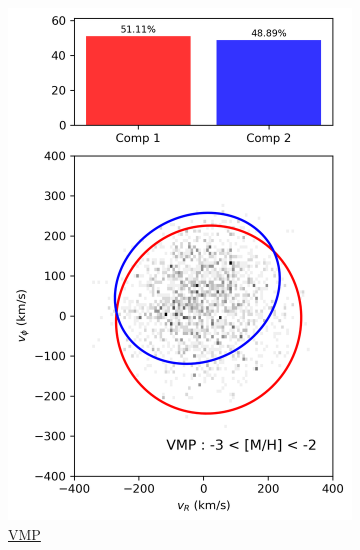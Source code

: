 \documentclass[a4paper,10pt]{article}
\begin{document}
\begin{multicols}{2}
\begin{figure}[H]
  \centering
  \begin{subfigure}[t]{0.24\linewidth}
    \includegraphics[width=\linewidth]{../figures/gmm_VMP.png}
    \caption{\href{https://raw.githack.com/raunaq-rai/Disentangling-the-Milky-Way-using-GMM/main/figures/VMP\_\_-3\%5BM\_H\%5D-2.html}{VMP}}
    \label{fig:gmm_vmp}
  \end{subfigure}\hfill
  \begin{subfigure}[t]{0.24\linewidth}

\end{subfigure}
\end{figure}
\end{multicols}
\end{document}
